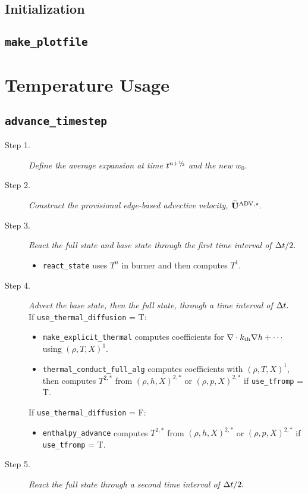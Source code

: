\subsection{Initialization}
\subsection{{\tt make\_plotfile}}
\section{Temperature Usage}
\subsection{{\tt advance\_timestep}}
\begin{description}
\item[Step 1.] {\em Define the average expansion at time $t^\nph$ and the new $w_0.$}
\item[Step 2.] {\em Construct the provisional edge-based advective velocity, $\widetilde{\mathbf{U}}^{\mathrm{ADV},\star}.$}
\item[Step 3.] {\em React the full state and base state through the first time interval 
of $\Delta t/2.$}
\begin{itemize}
\item{\tt react\_state} uses $T^n$ in burner and then computes $T^1$.
\end{itemize}
\item[Step 4.] {\em Advect the base state, then the full state, through a time interval 
of $\Delta t.$}\\
If {\tt use\_thermal\_diffusion} = T:
\begin{itemize}
\item {\tt make\_explicit\_thermal} computes coefficients for 
$\nabla\cdot k_{\rm th}\nabla h + \cdots$ using $(\rho,T,X)^1$.
\item {\tt thermal\_conduct\_full\_alg} computes coefficients with $(\rho,T,X)^1$, then 
computes $T^{2,*}$ from $(\rho,h,X)^{2,*}$ or $(\rho,p,X)^{2,*}$ if {\tt use\_tfromp} = T.
\end{itemize}
If {\tt use\_thermal\_diffusion} = F:
\begin{itemize}
\item {\tt enthalpy\_advance} computes $T^{2,*}$ from $(\rho,h,X)^{2,*}$ or $(\rho,p,X)^{2,*}$
if {\tt use\_tfromp} = T.
\end{itemize}
\item[Step 5.] {\em React the full state through a second time interval of $\Delta t/2.$}
\begin{itemize}

\end{itemize}
\end{description}
